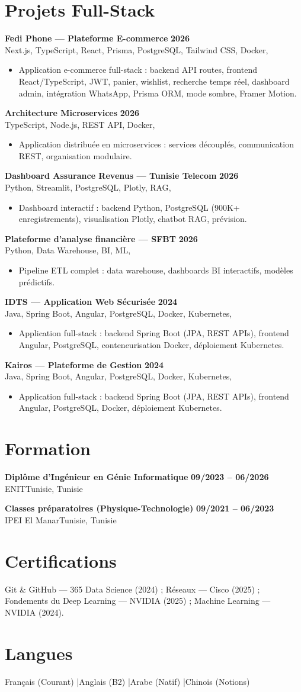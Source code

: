 \documentclass[a4paper,10pt]{article}
\newcommand{\cventry}[4]{\textbf{#1} \hfill \textbf{#4}\\[1pt]#2{\ifx\relax#3\relax\else, #3\fi}\par\vspace{1pt}}
\begin{document}
\section{Projets Full-Stack}
\cventry{Fedi Phone --- Plateforme E-commerce}{Next.js, TypeScript, React, Prisma, PostgreSQL, Tailwind CSS, Docker}{}{2026}
\begin{itemize}
  \item Application e-commerce full-stack : backend API routes, frontend React/TypeScript, JWT, panier, wishlist, recherche temps réel, dashboard admin, intégration WhatsApp, Prisma ORM, mode sombre, Framer Motion.
\end{itemize}
\cventry{Architecture Microservices}{TypeScript, Node.js, REST API, Docker}{}{2026}
\begin{itemize}
  \item Application distribuée en microservices : services découplés, communication REST, organisation modulaire.
\end{itemize}
\cventry{Dashboard Assurance Revenus --- Tunisie Telecom}{Python, Streamlit, PostgreSQL, Plotly, RAG}{}{2026}
\begin{itemize}
  \item Dashboard interactif : backend Python, PostgreSQL (900K+ enregistrements), visualisation Plotly, chatbot RAG, prévision.
\end{itemize}
\cventry{Plateforme d'analyse financière --- SFBT}{Python, Data Warehouse, BI, ML}{}{2026}
\begin{itemize}
  \item Pipeline ETL complet : data warehouse, dashboards BI interactifs, modèles prédictifs.
\end{itemize}
\cventry{IDTS --- Application Web Sécurisée}{Java, Spring Boot, Angular, PostgreSQL, Docker, Kubernetes}{}{2024}
\begin{itemize}
  \item Application full-stack : backend Spring Boot (JPA, REST APIs), frontend Angular, PostgreSQL, conteneurisation Docker, déploiement Kubernetes.
\end{itemize}
\cventry{Kairos --- Plateforme de Gestion}{Java, Spring Boot, Angular, PostgreSQL, Docker, Kubernetes}{}{2024}
\begin{itemize}
  \item Application full-stack : backend Spring Boot (JPA, REST APIs), frontend Angular, PostgreSQL, Docker, déploiement Kubernetes.
\end{itemize}
\section{Formation}
\cventry{Diplôme d'Ingénieur en Génie Informatique}{ENIT}{Tunisie}{09/2023 -- 06/2026}
\cventry{Classes préparatoires (Physique-Technologie)}{IPEI El Manar}{Tunisie}{09/2021 -- 06/2023}
\section{Certifications}
Git \& GitHub --- 365 Data Science (2024) ; Réseaux --- Cisco (2025) ; Fondements du Deep Learning --- NVIDIA (2025) ; Machine Learning --- NVIDIA (2024).
\section{Langues}
Français (Courant) \quad|\quad Anglais (B2) \quad|\quad Arabe (Natif) \quad|\quad Chinois (Notions)
\end{document}
